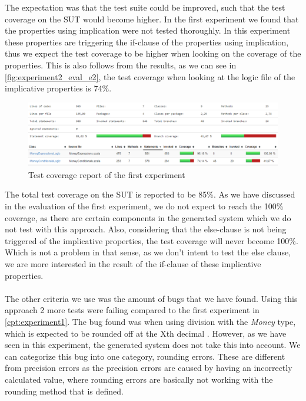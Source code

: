 The expectation was that the test suite could be improved, such that the test coverage on the SUT would become higher. In the first experiment we found that the properties using implication were not tested thoroughly. In this experiment these properties are triggering the if-clause of the properties using implication, thus we expect the test coverage to be higher when looking on the coverage of the properties. This is also follows from the results, as we can see in \autoref{fig:experiment2_eval_e2}, the test coverage when looking at the logic file of the implicative properties is 74\%.
\FloatBarrier
\begin{figure}[!ht]
	\includegraphics[width=\linewidth]{figures/eval_experiment2}
\caption{Test coverage report of the first experiment}
\label{fig:experiment2_eval_e2}
\centering
\end{figure}
\FloatBarrier
The total test coverage on the SUT is reported to be 85\%. As we have discussed in the evaluation of the first experiment, we do not expect to reach the 100\% coverage, as there are certain components in the generated system which we do not test with this approach. Also, considering that the else-clause is not being triggered of the implicative properties, the test coverage will never become 100\%. Which is not a problem in that sense, as we don't intent to test the else clause, we are more interested in the result of the if-clause of these implicative properties.\\
\\
The other criteria we use was the amount of bugs that we have found. Using this approach 2 more tests were failing compared to the first experiment in \autoref{cpt:experiment1}. The bug found was when using division with the \textit{Money} type, which is expected to be rounded off at the Xth decimal . However, as we have seen in this experiment, the generated system does not take this into account. We can categorize this bug into one category, rounding errors. These are different from precision errors as the precision errors are caused by having an incorrectly calculated value, where rounding errors are basically not working with the rounding method that is defined.

